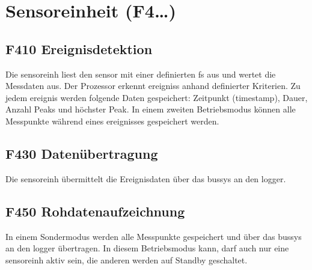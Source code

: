 \section{Sensoreinheit (F4\ldots)}


\subsection{F410 Ereignisdetektion}
Die \gls{sensoreinh} liest den \gls{sensor} mit einer definierten \gls{fs} aus und wertet die Messdaten aus. Der Prozessor erkennt \glspl{ereignis} anhand definierter Kriterien. Zu jedem \gls{ereignis} werden folgende Daten gespeichert: Zeitpunkt (\gls{timestamp}), Dauer, Anzahl Peaks und höchster Peak. In einem zweiten Betriebsmodus können alle Messpunkte während eines \gls{ereignis}ses gespeichert werden.


\subsection{F430 Datenübertragung}
Die \gls{sensoreinh} übermittelt die Ereignisdaten über das \gls{bussys} an den \gls{logger}.


\subsection{F450 Rohdatenaufzeichnung}
In einem Sondermodus werden alle Messpunkte gespeichert und über das \gls{bussys} an den \gls{logger} übertragen. In diesem Betriebsmodus kann, darf auch nur eine \gls{sensoreinh} aktiv sein, die anderen werden auf Standby geschaltet.


